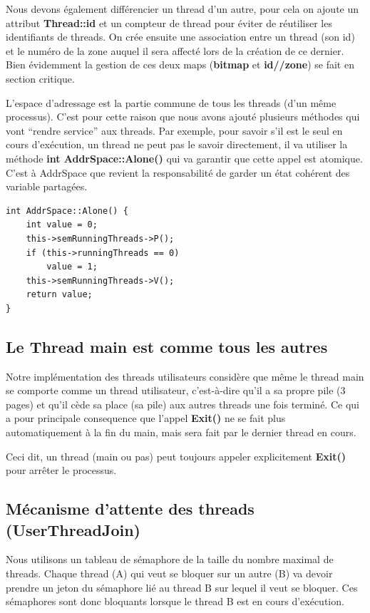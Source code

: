 \documentclass[a4paper,10pt]{article}
\begin{document}
Nous devons également différencier un thread d'un autre, pour cela on ajoute un
attribut \textbf{Thread::id} et un compteur de thread pour éviter de réutiliser
les identifiants de threads. On crée ensuite une association entre un thread
(son id) et le numéro de la zone auquel il sera affecté lors de la création de
ce dernier. Bien évidemment la gestion de ces deux maps (\textbf{bitmap} et
\textbf{id//zone}) se fait en section critique.

L'espace d'adressage est la partie commune de tous les threads (d'un même
processus). C'est pour cette raison que nous avons ajouté plusieurs méthodes
qui vont ``rendre service'' aux threads. Par exemple, pour savoir s'il est le
seul en cours d'exécution, un thread ne peut pas le savoir directement, il va
utiliser la méthode \textbf{int AddrSpace::Alone()} qui va garantir que cette
appel est atomique. C'est à AddrSpace que revient la responsabilité de garder
un état cohérent des variable partagées.

\begin{lstlisting}
int AddrSpace::Alone() {
    int value = 0;
    this->semRunningThreads->P();
    if (this->runningThreads == 0)
        value = 1;
    this->semRunningThreads->V();
    return value;
}
\end{lstlisting}

\subsection{Le Thread main est comme tous les autres}

Notre implémentation des threads utilisateurs considère que même le thread main
se comporte comme un thread utilisateur, c'est-à-dire qu'il a sa propre pile (3
pages) et qu'il cède sa place (sa pile) aux autres threads une fois terminé. Ce
qui a pour principale consequence que l'appel \textbf{Exit()} ne se fait plus
automatiquement à la fin du main, mais sera fait par le dernier thread en cours.

Ceci dit, un thread (main ou pas) peut toujours appeler explicitement
\textbf{Exit()} pour arrêter le processus.


\subsection{Mécanisme d'attente des threads (UserThreadJoin)}

Nous utilisons un tableau de sémaphore de la taille du nombre maximal de threads.
Chaque thread (A) qui veut se bloquer sur un autre (B) va devoir prendre un jeton
du sémaphore lié au thread B sur lequel il veut se bloquer. Ces sémaphores sont
donc bloquants lorsque le thread B est en cours d'exécution.
\end{document}
